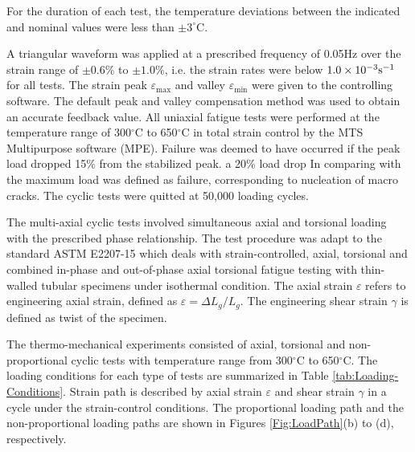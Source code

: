 For the duration of each test, the temperature deviations between the indicated and nominal values were less than $\pm3^{\circ}$C.


A triangular waveform was applied at a prescribed frequency of 0.05Hz over the strain range of $\pm 0.6\%$ to $\pm 1.0\%$, i.e. the strain rates were below $1.0\times 10^{-3}\rm{s}^{-1}$ for all tests.
The strain peak  $\varepsilon_{\max}$ and valley $\varepsilon_{\min}$ were given to the controlling software.
The default peak and valley compensation method was used to obtain an accurate feedback value.
All uniaxial fatigue tests were performed at the temperature range of 300$^{\circ}$C to 650$^{\circ}$C in total strain control by the MTS Multipurpose software (MPE).
Failure was deemed to have occurred if the peak load dropped 15\% from the stabilized peak. a 20\% load drop In comparing with the maximum load  was defined as failure, corresponding to nucleation of macro cracks.
The cyclic tests were quitted at 50,000 loading cycles.

The multi-axial cyclic tests involved simultaneous axial and torsional loading with the prescribed phase relationship.
The test procedure was adapt to the standard ASTM E2207-15 which deals with strain-controlled, axial, torsional and combined in-phase and out-of-phase axial torsional fatigue testing with thin-walled tubular specimens under isothermal condition.
The axial strain $\varepsilon$ refers to engineering axial strain, defined as $\varepsilon=\Delta L_g/L_g$. The engineering shear strain $\gamma$ is defined as twist of the specimen.

The thermo-mechanical experiments consisted of axial, torsional and non-proportional cyclic tests with temperature range from 300$^{\circ}$C to 650$^{\circ}$C. The loading conditions for each type of tests are summarized in Table \ref{tab:Loading-Conditions}.
Strain path is described by axial strain $\varepsilon$ and shear strain $\gamma$ in a cycle under the  strain-control conditions. The proportional loading path and the non-proportional loading paths are shown in Figures \ref{Fig:LoadPath}(b) to (d), respectively.


